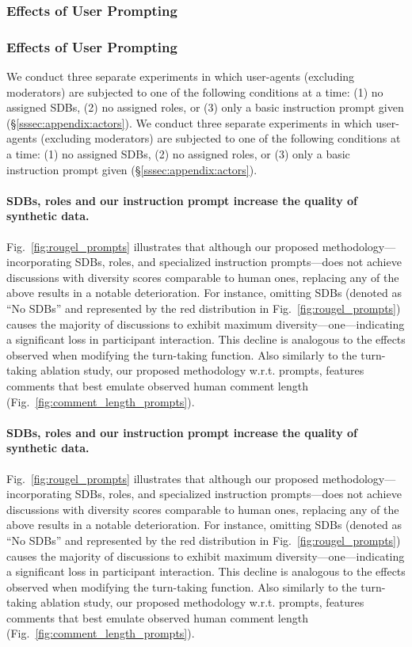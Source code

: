 \subsubsection{Effects of User Prompting}
\subsubsection{Effects of User Prompting}

We conduct three separate experiments in which user-agents (excluding moderators) are subjected to one of the following conditions at a time: (1) no assigned \acp{SDB}, (2) no assigned roles, or (3) only a basic instruction prompt given (\S\ref{sssec:appendix:actors}). 
We conduct three separate experiments in which user-agents (excluding moderators) are subjected to one of the following conditions at a time: (1) no assigned \acp{SDB}, (2) no assigned roles, or (3) only a basic instruction prompt given (\S\ref{sssec:appendix:actors}). 

\paragraph{\acp{SDB}, roles and our instruction prompt increase the quality of synthetic data.} Fig.~\ref{fig:rougel_prompts} illustrates that although our proposed methodology---incorporating \acp{SDB}, roles, and specialized instruction prompts---does not achieve discussions with diversity scores comparable to human ones, replacing any of the above results in a notable deterioration. For instance, omitting \acp{SDB} (denoted as ``No \acp{SDB}'' and represented by the red distribution in Fig.~\ref{fig:rougel_prompts}) causes the majority of discussions to exhibit maximum diversity---one---indicating a significant loss in participant interaction. This decline is analogous to the effects observed when modifying the turn-taking function. Also similarly to the turn-taking ablation study, our proposed methodology w.r.t. prompts, features comments that best emulate observed human comment length (Fig.~\ref{fig:comment_length_prompts}).
\paragraph{\acp{SDB}, roles and our instruction prompt increase the quality of synthetic data.} Fig.~\ref{fig:rougel_prompts} illustrates that although our proposed methodology---incorporating \acp{SDB}, roles, and specialized instruction prompts---does not achieve discussions with diversity scores comparable to human ones, replacing any of the above results in a notable deterioration. For instance, omitting \acp{SDB} (denoted as ``No \acp{SDB}'' and represented by the red distribution in Fig.~\ref{fig:rougel_prompts}) causes the majority of discussions to exhibit maximum diversity---one---indicating a significant loss in participant interaction. This decline is analogous to the effects observed when modifying the turn-taking function. Also similarly to the turn-taking ablation study, our proposed methodology w.r.t. prompts, features comments that best emulate observed human comment length (Fig.~\ref{fig:comment_length_prompts}).